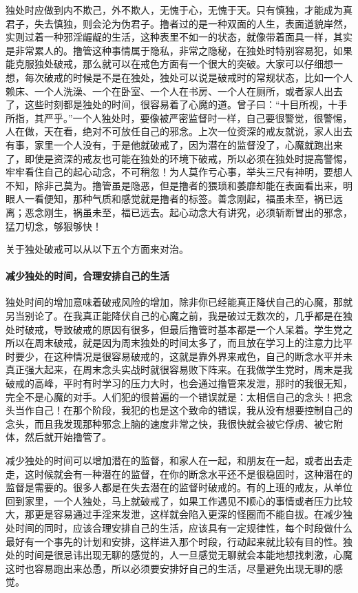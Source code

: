 独处时应做到内不欺己，外不欺人，无愧于心，无愧于天。只有慎独，才能成为真君子，失去慎独，则会沦为伪君子。撸者过的是一种双面的人生，表面道貌岸然，实则过着一种邪淫龌龊的生活，这种表里不如一的状态，就像带着面具一样，其实是非常累人的。撸管这种事情属于隐私，非常之隐秘，在独处时特别容易犯，如果能克服独处破戒，那么就可以在戒色方面有一个很大的突破。大家可以仔细想一想，每次破戒的时候是不是在独处，独处可以说是破戒时的常规状态，比如一个人赖床、一个人洗澡、一个在卧室、一个人在书房、一个人在厕所，或者家人出去了，这些时刻都是独处的时间，很容易着了心魔的道。曾子曰：“十目所视，十手所指，其严乎。”一个人独处时，要像被严密监督时一样，自己要很警觉，很警惕，人在做，天在看，绝对不可放任自己的邪念。上次一位资深的戒友就说，家人出去有事，家里一个人没有，于是他就破戒了，因为潜在的监督没了，心魔就跑出来了，即使是资深的戒友也可能在独处的环境下破戒，所以必须在独处时提高警惕，牢牢看住自己的起心动念，不可稍忽！为人莫作亏心事，举头三尺有神明，要想人不知，除非己莫为。撸管虽是隐恶，但是撸者的猥琐和萎靡却能在表面看出来，明眼人一看便知，那种气质和感觉就是撸者的标签。善念刚起，福虽未至，祸已远离；恶念刚生，祸虽未至，福已远去。起心动念大有讲究，必须斩断冒出的邪念，猛刀切念，够狠够快！

关于独处破戒可以从以下五个方面来对治。

\paragraph{减少独处的时间，合理安排自己的生活}

独处时间的增加意味着破戒风险的增加，除非你已经能真正降伏自己的心魔，那就另当别论了。在我真正能降伏自己的心魔之前，我是破过无数次的，几乎都是在独处时破戒，导致破戒的原因有很多，但最后撸管时基本都是一个人呆着。学生党之所以在周末破戒，就是因为周末独处的时间太多了，而且放在学习上的注意力比平时要少，在这种情况是很容易破戒的，这就是靠外界来戒色，自己的断念水平并未真正强大起来，在周末念头实战时就很容易败下阵来。在我做学生党时，周末是我破戒的高峰，平时有时学习的压力大时，也会通过撸管来发泄，那时的我很无知，完全不是心魔的对手。人们犯的很普遍的一个错误就是：太相信自己的念头！把念头当作自己！在那个阶段，我犯的也是这个致命的错误，我从没有想要控制自己的念头，而且我发现那种邪念上脑的速度非常之快，我很快就会被它俘虏、被它附体，然后就开始撸管了。

减少独处的时间可以增加潜在的监督，和家人在一起，和朋友在一起，或者出去走走，这时候就会有一种潜在的监督，在你的断念水平还不是很稳固时，这种潜在的监督是需要的。很多人都是在失去潜在的监督时破戒的。有的上班的戒友，从单位回到家里，一个人独处，马上就破戒了，如果工作遇见不顺心的事情或者压力比较大，那更是容易通过手淫来发泄，这样就会陷入更深的怪圈而不能自拔。在减少独处时间的同时，应该合理安排自己的生活，应该具有一定规律性，每个时段做什么最好有一个事先的计划和安排，这样进入那个时段，行动起来就比较有目的性。独处的时间是很忌讳出现无聊的感觉的，人一旦感觉无聊就会本能地想找刺激，心魔这时也容易跑出来怂恿，所以必须要安排好自己的生活，尽量避免出现无聊的感觉。


